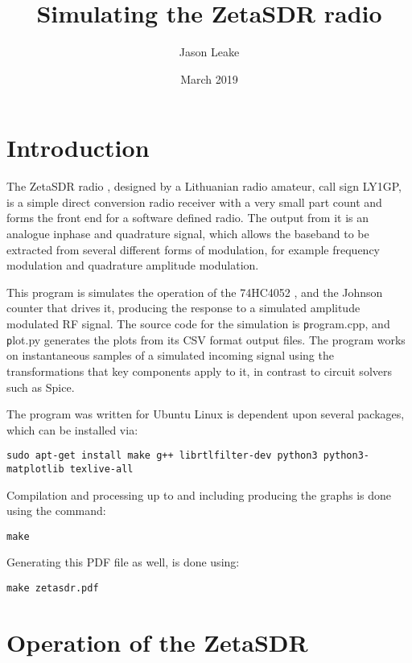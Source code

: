 \documentclass[11pt, twoside]{article}
\begin{document}
\title{Simulating the ZetaSDR radio}
\author{Jason Leake}
\date{March 2019}
\maketitle
\section{Introduction}
The ZetaSDR radio \citep{ly1gp:2007}, designed by a Lithuanian radio
amateur, call sign LY1GP, is a simple direct conversion radio receiver
with a very small part count and forms the front end for a software
defined radio. The output from it is an analogue inphase and
quadrature signal, which allows the baseband to be extracted from
several different forms of modulation, for example frequency
modulation and quadrature amplitude modulation.

This program is simulates the operation of the 74HC4052
\citep{Motorola:1996}, and the Johnson counter that drives it,
producing the response to a simulated amplitude modulated RF
signal. The source code for the simulation is {\texttt program.cpp},
and {\texttt plot.py} generates the plots from its CSV format output
files.  The program works on instantaneous samples of a simulated
incoming signal using the transformations that key components apply to
it, in contrast to circuit solvers such as Spice.

The program was written for Ubuntu Linux is dependent upon several
packages, which can be installed via:

\begin{lstlisting}
sudo apt-get install make g++ librtlfilter-dev python3 python3-matplotlib texlive-all
\end{lstlisting}

Compilation and processing up to and including producing the graphs is
done using the command:

\begin{lstlisting}
make
\end{lstlisting}

Generating this PDF file as well, is done using:

\begin{lstlisting}
make zetasdr.pdf
\end{lstlisting}

\section{Operation of the ZetaSDR}
\end{document}
